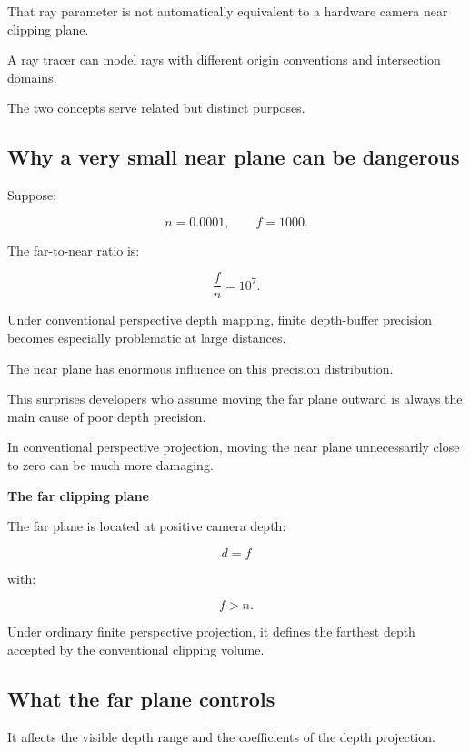 That ray parameter is not automatically equivalent to a hardware camera near clipping plane.

A ray tracer can model rays with different origin conventions and intersection domains.

The two concepts serve related but distinct purposes.

\subsection{Why a very small near plane can be dangerous}\label{02-foundations-ii-ch033-why-a-very-small-near-plane-can-be-dangerous}

\hypertarget{02-foundations-ii-ch033-why-a-very-small-near-plane-can-be-dangerous}{}

Suppose:

\[
 n=0.0001, \qquad f=1000.
\]

The far-to-near ratio is:

\[
 \frac fn=10^7.
\]

Under conventional perspective depth mapping, finite depth-buffer precision becomes especially problematic at large distances.

The near plane has enormous influence on this precision distribution.

This surprises developers who assume moving the far plane outward is always the main cause of poor depth precision.

In conventional perspective projection, moving the near plane unnecessarily close to zero can be much more damaging.

\textbf{The far clipping plane}

The far plane is located at positive camera depth:

\[
 \boxed{d=f}
\]

with:

\[
 f>n.
\]

Under ordinary finite perspective projection, it defines the farthest depth accepted by the conventional clipping volume.

\subsection{What the far plane controls}\label{02-foundations-ii-ch033-what-the-far-plane-controls}

\hypertarget{02-foundations-ii-ch033-what-the-far-plane-controls}{}

It affects the visible depth range and the coefficients of the depth projection.

